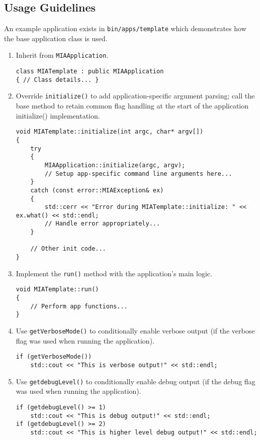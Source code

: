 \subsection*{Usage Guidelines}
An example application exists in \texttt{bin/apps/template} which demonstrates how the base application class is used.
\begin{enumerate}
	\item Inherit from \texttt{MIAApplication}.
	\begin{lstlisting}[style=cppstyle]
class MIATemplate : public MIAApplication
{ // Class details... }
	\end{lstlisting}
 
	\item Override \texttt{initialize()} to add application-specific argument parsing; call the base method to retain common flag handling at the start of the application initialize() implementation.
	\begin{lstlisting}[style=cppstyle]
void MIATemplate::initialize(int argc, char* argv[])
{
	try
	{    
		MIAApplication::initialize(argc, argv);	
		// Setup app-specific command line arguments here...
	}
	catch (const error::MIAException& ex)
	{
		std::cerr << "Error during MIATemplate::initialize: " << ex.what() << std::endl;
		// Handle error appropriately...
	}
	
	// Other init code...
}
	\end{lstlisting}
 
	\item Implement the \texttt{run()} method with the application's main logic.
	\begin{lstlisting}[style=cppstyle]
void MIATemplate::run()
{
	// Perform app functions...
}
	\end{lstlisting}
 
	\item Use \texttt{getVerboseMode()} to conditionally enable verbose output (if the verbose flag was used when running the application).
	\begin{lstlisting}[style=cppstyle]
if (getVerboseMode())
    std::cout << "This is verbose output!" << std::endl;
	\end{lstlisting}

	\item Use \texttt{getdebugLevel()} to conditionally enable debug output (if the debug flag was used when running the application).
\begin{lstlisting}[style=cppstyle]
if (getdebugLevel() >= 1)
	std::cout << "This is debug output!" << std::endl;
if (getdebugLevel() >= 2)
	std::cout << "This is higher level debug output!" << std::endl;
\end{lstlisting}
 

\end{enumerate}
